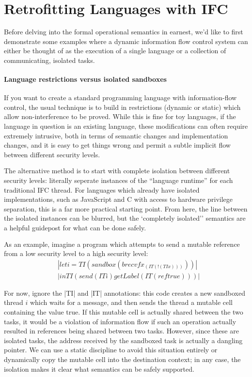 \section{Retrofitting Languages with IFC}
\label{sec:retrofit}

Before delving into the formal operational semantics in earnest, we'd
like to first demonstrate some examples where a dynamic information flow
control system can either be thought of as the execution of a single
language or a collection of communicating, isolated tasks.


\paragraph{Language restrictions versus isolated sandboxes}  If you want
to create a standard programming language with information-flow control,
the usual technique is to build in restrictions (dynamic or static)
which allow non-interference to be proved.  While this is fine for toy
languages, if the language in question is an existing language, these
modifications can often require extremely intrusive, both in terms of
semantic changes and implementation changes, and it is easy to get things
wrong and permit a subtle implicit flow between different security levels.

The alternative method is to start with complete isolation between
different security levels: literally seperate instances of the
``language runtime'' for each traditional IFC thread.  For languages
which already have isolated implementations, such as JavaScript and C
with access to hardware privilege separation, this is a far more
practical starting point.  From here, the line between the isolated
instances can be blurred, but the `completely isolated'' semantics
are a helpful guidepost for what can be done safely.

As an example, imagine a program which attempts to send a mutable
reference from a low security level to a high security level:
\begin{align*}
    & |let i = TI (sandbox (brecvf x _ (IT (!(TI x)))))|\\
    & |in TI (send (IT i) getLabel (IT (ref true)))|
\end{align*}

For now, ignore the |TI| and |IT| annotations: this code creates a new
sandboxed thread $i$ which waits for a message, and then sends the
thread a mutable cell containing the value true.  If this mutable cell
is actually shared between the two tasks, it would be a violation of
information flow if such an operation actually resulted in references
being shared between two tasks.  However, since these are isolated
tasks, the address received by the sandboxed task is actually a dangling
pointer.  We can use a static discipline to avoid this situation
entirely or dynamically copy the mutable cell into the destination
context; in any case, the isolation makes it clear what semantics can
be safely supported.

